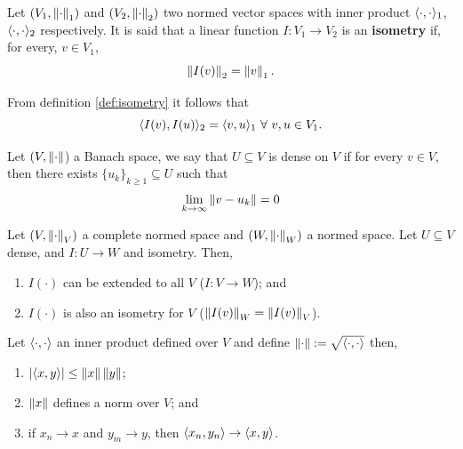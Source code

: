 \documentclass[../TGMAFFIRO]{subfiles}
\begin{document}
\begin{definition}\label{def:isometry}
	Let $(V_1, \left\lVert\cdot\right\rVert_1)$ and $(V_2, \left\lVert\cdot\right\rVert_2)$ two normed vector spaces with inner product $\langle \cdot, \cdot\rangle_1$, $\langle \cdot, \cdot\rangle_2$ respectively. It is said that a linear function $I:V_1\to V_2$ is an \textbf{isometry} if, for every, $v\in V_1$,
	\begin{equation}
		\left\lVert I(v)\right\rVert_2  = \left\lVert v\right\rVert_1.
	\end{equation}
\end{definition}

\begin{remark}
	From definition \ref{def:isometry} it follows that
	\begin{equation}
		\innerprod{I(v)}{I(u)}_2 = \innerprod{v}{u}_1 \ \forall \ v,u\in V_1.
	\end{equation}
\end{remark}

\begin{definition}
	Let $(V, \left\lVert\cdot\right\rVert$) a Banach space, we say that $U \subseteq V$ is dense on $V$ if for every $v\in V$, then there exists $\{u_k\}_{k\geq 1} \subseteq U$ such that 
	\begin{equation}
		\lim_{k\to\infty} \left\lVert v - u_k\right\rVert = 0
	\end{equation}

\end{definition}

\begin{proposition}
	Let $(V, \left\lVert\cdot\right\rVert_V)$ a complete normed space and $(W, \left\lVert\cdot\right\rVert_W)$ a normed space. Let $U\subseteq V$ dense, and $I:U\to W$ and isometry. Then,
	\begin{enumerate}
		\item $I(\cdot)$ can be extended to all $V$ ($I: V\to W$); and
		\item $I(\cdot)$ is also an isometry for $V$ ($\left\lVert I(v)\right\rVert_W = \left\lVert I(v)\right\rVert_V$).
	\end{enumerate}
\end{proposition}

\begin{proposition}\label{def:hilbert_space}
	Let $\langle \cdot, \cdot\rangle$	 an inner product defined over $V$ and define $\left\lVert\cdot\right\rVert:=\sqrt{\langle \cdot, \cdot\rangle}$ then,
	\begin{enumerate}
		\item $|\langle x, y\rangle| \leq \left\lVert x\right\rVert \left\lVert y\right\rVert$;
		\item $\left\lVert x\right\rVert$ defines a norm over $V$; and
		\item if $x_n \to x$ and $y_m \to y$, then $\langle x_n, y_n\rangle \to \langle x, y\rangle$.
	\end{enumerate}
\end{proposition}
\end{document}
